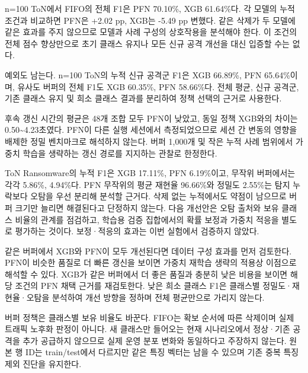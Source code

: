 n=\allowbreak{}100 ToN에서 FIFO의 전체 F1은 PFN 70.10\%, XGB 61.64\%다. 각 모델의 누적 조건과 비교하면 PFN은 +\allowbreak{}2.02 pp, XGB는 -5.49 pp 변했다. 같은 삭제가 두 모델에 같은 효과를 주지 않으므로 모델과 사례 구성의 상호작용을 분석해야 한다. 이 조건의 전체 점수 향상만으로 초기 클래스 유지나 모든 신규 공격 개선을 대신 입증할 수는 없다.

예외도 남는다. n=\allowbreak{}100 ToN의 누적 신규 공격군 F1은 XGB 66.89\%, PFN 65.64\%이며, 유사도 버퍼의 전체 F1도 XGB 60.35\%, PFN 58.66\%다. 전체 평균, 신규 공격군, 기존 클래스 유지 및 희소 클래스 결과를 분리하여 정책 선택의 근거로 사용한다.

후속 갱신 시간의 평균은 48개 조합 모두 PFN이 낮았고, 동일 정책 XGB와의 차이는 0.50\textasciitilde{}4.23초였다. PFN이 다른 실행 세션에서 측정되었으므로 세션 간 변동의 영향을 배제한 정밀 벤치마크로 해석하지 않는다. 버퍼 1,000개 및 작은 누적 사례 범위에서 가중치 학습을 생략하는 갱신 경로를 지지하는 관찰로 한정한다.

ToN Ransomware의 누적 F1은 XGB 17.11\%, PFN 6.19\%이고, 무작위 버퍼에서는 각각 5.86\%, 4.94\%다. PFN 무작위의 평균 재현율 96.66\%와 정밀도 2.55\%는 탐지 누락보다 오탐을 우선 분리해 분석할 근거다. 삭제 없는 누적에서도 약점이 남으므로 버퍼 크기만 늘리면 해결된다고 단정하지 않는다. 다음 개선안은 오탐 출처와 보유 클래스 비율의 관계를 점검하고, 학습용 검증 집합에서의 확률 보정과 가중치 적응을 별도로 평가하는 것이다. 보정·적응의 효과는 이번 실험에서 검증하지 않았다.

같은 버퍼에서 XGB와 PFN이 모두 개선된다면 데이터 구성 효과를 먼저 검토한다. PFN이 비슷한 품질로 더 빠른 갱신을 보이면 가중치 재학습 생략의 적용상 이점으로 해석할 수 있다. XGB가 같은 버퍼에서 더 좋은 품질과 충분히 낮은 비용을 보이면 해당 조건의 PFN 채택 근거를 재검토한다. 낮은 희소 클래스 F1은 클래스별 정밀도·재현율·오탐을 분석하여 개선 방향을 정하며 전체 평균만으로 가리지 않는다.

버퍼 정책은 클래스별 보유 비율도 바꾼다. FIFO는 확보 순서에 따른 삭제이며 실제 트래픽 노후화 판정이 아니다. 새 클래스만 들어오는 현재 시나리오에서 정상·기존 공격을 추가 공급하지 않으므로 실제 운영 분포 변화와 동일하다고 주장하지 않는다. 원본 행 ID는 train/\allowbreak{}test에서 다르지만 같은 특징 벡터는 남을 수 있으며 기존 중복 특징 제외 진단을 유지한다.

